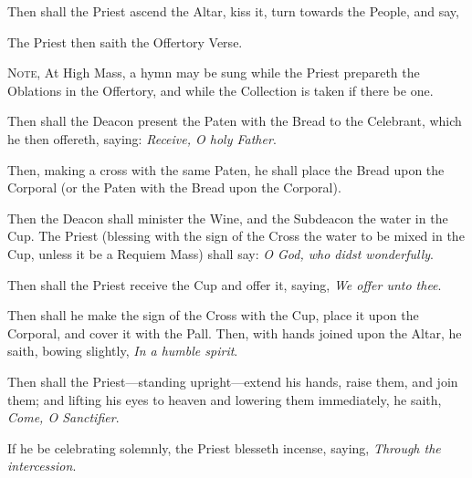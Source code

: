 \begin{rubric}
    Then shall the Priest ascend the Altar, kiss it, turn towards the People, and say,
\end{rubric}
\begin{multicols}{2}    
\begin{rubric}
    The Priest then saith the Offertory Verse.\par
    \textsc{Note,} At High Mass, a hymn may be sung while the Priest prepareth the Oblations in the Offertory, and while the Collection is taken if there be one.
\end{rubric}
\begin{rubric}
    Then shall the Deacon present the Paten with the Bread to the Celebrant, which he then offereth, saying: \emph{Receive, O holy Father}.
\end{rubric}
\columnbreak
\begin{rubric} 
    Then, making a cross with the same Paten, he shall place the Bread upon the Corporal (or the Paten with the Bread upon the Corporal).
\end{rubric}
\begin{rubric}
	Then the Deacon shall minister the Wine, and the Subdeacon the water in the Cup. The Priest (blessing with the sign of the Cross the water to be mixed in the Cup, unless it be a Requiem Mass) shall say: \emph{O God, who didst wonderfully}.
\end{rubric}
\begin{rubric}
    Then shall the Priest receive the Cup and offer it, saying, \emph{We offer unto thee}.
\end{rubric}
\begin{rubric}
    Then shall he make the sign of the Cross with the Cup, place it upon the Corporal, and cover it with the Pall. Then, with hands joined upon the Altar, he saith, bowing slightly, \emph{In a humble spirit}.
\end{rubric}
\begin{rubric}
    Then shall the Priest---standing upright---extend his hands, raise them, and join them; and lifting his eyes to heaven and lowering them immediately, he saith, \emph{Come, O Sanctifier}.
\end{rubric}
\begin{rubric}
    If he be celebrating solemnly, the Priest blesseth incense, saying, \emph{Through the intercession}.

\end{rubric}
\end{multicols}
